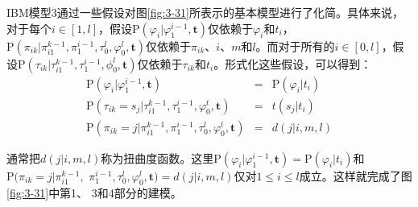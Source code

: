 \parinterval IBM模型3通过一些假设对图\ref{fig:3-31}所表示的基本模型进行了化简。具体来说，对于每个$i\in[1,l]$，假设$\textrm{P}(\varphi_i |\varphi_1^{i-1},\mathbf{t})$仅依赖于$\varphi_i$和$t_i$，$\textrm{P}(\pi_{ik}|\pi_{i1}^{k-1},\pi_1^{i-1},\tau_0^l,\varphi_0^l,\mathbf{t})$仅依赖于$\pi_{ik}$、$i$、$m$和$l$。而对于所有的$i\in[0,l]$，假设$\textrm{P}(\tau_{ik}|\tau_{i1}^{k-1},\tau_1^{i-1},\phi_0^l,\mathbf{t})$仅依赖于$\tau_{ik}$和$t_i$。形式化这些假设，可以得到：
\begin{eqnarray}
\textrm{P}(\varphi_i|\varphi_1^{i-1},\mathbf{t})                                                              & = &{\textrm{P}(\varphi_i|t_i)} \label{eq:3-67} \\
\textrm{P}(\tau_{ik} = s_j |\tau_{i1}^{k-1},\tau_{1}^{i-1},\varphi_0^t,\mathbf{t})             & = & t(s_j|t_i) \label{eq:3-68} \\
\textrm{P}(\pi_{ik} = j |\pi_{i1}^{k-1},\pi_{1}^{i-1},\tau_{0}^{l},\varphi_{0}^{l},\mathbf{t}) & = & d(j|i,m,l) \label{eq:3-69}
\label{eq:3-49}
\end{eqnarray}

\parinterval 通常把$d(j|i,m,l)$称为扭曲度函数。这里$\textrm{P}(\varphi_i|\varphi_1^{i-1},\mathbf{t})={\textrm{P}(\varphi_i|t_i)}$和${\textrm{P}(\pi_{ik}=j|\pi_{i1}^{k-1},}$ $\pi_{1}^{i-1},\tau_0^l,\varphi_0^l,\mathbf{t})=d(j|i,m,l)$仅对$1 \le i \le l$成立。这样就完成了图\ref{fig:3-31}中第1、 3和4部分的建模。

